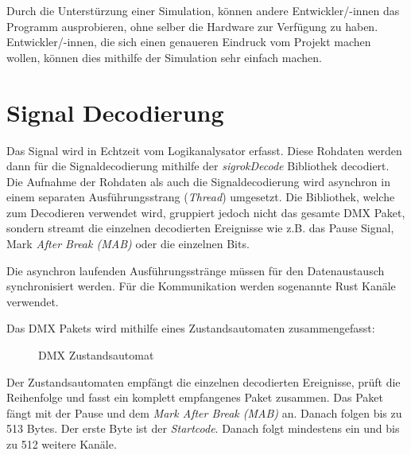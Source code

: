 Durch die Unterstürzung einer Simulation, können andere Entwickler/-innen das Programm ausprobieren, ohne selber die Hardware zur Verfügung zu haben. Entwickler/-innen, die sich einen genaueren Eindruck vom Projekt machen wollen, können dies mithilfe der Simulation sehr einfach machen.


\section{Signal Decodierung}


Das Signal wird in Echtzeit vom Logikanalysator erfasst. Diese Rohdaten werden dann für die Signaldecodierung mithilfe der \emph{sigrokDecode} \cite{githubLibsigrokDecode} Bibliothek decodiert. Die Aufnahme der Rohdaten als auch die Signaldecodierung wird asynchron in einem separaten Ausführungsstrang (\emph{Thread}) umgesetzt. Die Bibliothek, welche zum Decodieren verwendet wird, gruppiert jedoch nicht das gesamte DMX Paket, sondern streamt die einzelnen decodierten Ereignisse wie z.B. das Pause Signal, Mark \emph{After Break (MAB)} oder die einzelnen Bits.

Die asynchron laufenden Ausführungsstränge müssen für den Datenaustausch synchronisiert werden. Für die Kommunikation werden sogenannte Rust Kanäle verwendet.

Das DMX Pakets wird mithilfe eines Zustandsautomaten zusammengefasst:

\begin{figure}[H]
	\centering
	\caption{DMX Zustandsautomat}
	\label{fig:my_label}
\end{figure}

Der Zustandsautomaten empfängt die einzelnen decodierten Ereignisse, prüft die Reihenfolge und fasst ein komplett empfangenes Paket zusammen. Das Paket fängt mit der Pause und dem \emph{Mark After Break (MAB)} an. Danach folgen bis zu 513 Bytes. Der erste Byte ist der \emph{Startcode}. Danach folgt mindestens ein und bis zu 512 weitere Kanäle.

